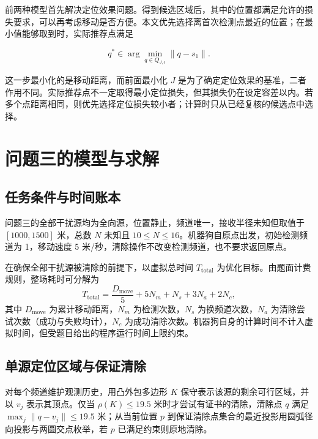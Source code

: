 \documentclass[UTF8,a4paper,zihao=-4,fontset=none]{ctexart}
\begin{document}
前两种模型首先解决定位效果问题。得到候选区域后，其中的位置都满足允许的损失要求，可以再考虑移动是否方便。本文优先选择离首次检测点最近的位置；在最小值能够取到时，实际推荐点满足

\begin{equation}
 q^*\in\arg\min_{q\in Q_{J,\epsilon}}\|q-s_1\|.
 \label{eq:q2-candidate-selection}
\end{equation}

这一步最小化的是移动距离，而前面最小化 \(J\) 是为了确定定位效果的基准，二者作用不同。实际推荐点不一定取得最小定位损失，但其损失仍在设定容差以内。若多个点距离相同，则优先选择定位损失较小者；计算时只从已经复核的候选点中选择。

\section{问题三的模型与求解}

\subsection{任务条件与时间账本}

问题三的全部干扰源均为全向源，位置静止，频道唯一，接收半径未知但取值于 \([1000,1500]\) 米，总数 \(N\) 未知且 \(10\le N\le16\)。机器狗自原点出发，初始检测频道为 1，移动速度 5 米/秒，清除操作不改变检测频道，也不要求返回原点。

在确保全部干扰源被清除的前提下，以虚拟总时间 \(T_{\mathrm{total}}\) 为优化目标。由题面计费规则，整场耗时可分解为
\begin{equation}
  T_{\mathrm{total}}=\frac{D_{\mathrm{move}}}{5}+5N_m+N_s+3N_a+2N_c,
  \label{eq:q3-ledger}
\end{equation}
其中 \(D_{\mathrm{move}}\) 为累计移动距离，\(N_m\) 为检测次数，\(N_s\) 为换频道次数，\(N_a\) 为清除尝试次数（成功与失败均计），\(N_c\) 为成功清除次数。机器狗自身的计算时间不计入虚拟时间，但受题目给出的程序运行时间上限约束。

\subsection{单源定位区域与保证清除}

对每个频道维护观测历史，用凸外包多边形 \(K\) 保守表示该源的剩余可行区域，并以 \(v_j\) 表示其顶点。仅当 \(\rho(K)\le19.5\) 米时才尝试有证书的清除，清除点 \(q\) 满足 \(\max_j\lVert q-v_j\rVert\le19.5\) 米；从当前位置 \(p\) 到保证清除点集合的最近投影用圆弧径向投影与两圆交点枚举，若 \(p\) 已满足约束则原地清除。
\end{document}
